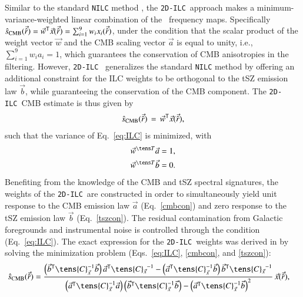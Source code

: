 \documentclass[traditabstract, longauth]{aa}
\newcommand{\twodilc}{{\tt 2D-ILC}}
\newcommand{\1}{\'\i }
\begin{document}
Similar to the standard {\tt NILC} method \citep{2012MNRAS.419.1163B,
2013MNRAS.430..370R}, the \twodilc\ approach makes a minimum-variance-weighted
linear combination of the \Planck\ frequency maps.
Specifically ${\hat{s}_{\rm CMB} (\vec{\hat{r}}) = \vec{w}^{\textsf T}
\vec{x}(\vec{\hat{r}}) = \sum_{i=1}^{9} w_i
x_i(\vec{\hat{r}})}$, under the condition that the scalar product of the
weight vector $\vec{w}$ and the CMB scaling vector $\vec{a}$ is equal to
unity, i.e., ${\sum_{i=1}^{9} w_i a_i = 1}$, which guarantees the
conservation of CMB anisotropies in the filtering. However, \twodilc\
\citep{2011MNRAS.410.2481R} generalizes the standard {\tt NILC} method
by offering an additional constraint for the ILC weights to be orthogonal to
the tSZ emission law $\vec{b}$, while guaranteeing the conservation of the CMB
component. The \twodilc\ CMB estimate is thus given by
\begin{eqnarray}\label{eq:ILC}
  \hat{s}_{\rm CMB} (\vec{\hat{r}})\, =\, \vec{w}^{\textsf T}
  \vec{x}(\vec{\hat{r}}),
\end{eqnarray}
such that the variance of Eq.~\eqref{eq:ILC} is minimized, with
\begin{eqnarray}
  \vec{w}^{\tens T} \vec{a} = 1, & \label{cmbcon} \\
  \vec{w}^{\tens T} \vec{b} = 0. & \label{tszcon}
\end{eqnarray}
Benefiting from the knowledge of the CMB and tSZ spectral signatures, the
weights of the \twodilc\ are constructed in order to simultaneously yield unit
response to the CMB emission law $\vec{a}$ (Eq.~\eqref{cmbcon}) and zero response
to the tSZ emission law $\vec{b}$ (Eq.~\eqref{tszcon}). The residual
contamination from Galactic foregrounds and instrumental noise is controlled
through the condition (Eq.~\eqref{eq:ILC}). The exact expression
for the \twodilc\ weights was derived in \citet{2011MNRAS.410.2481R} by
solving the minimization problem (Eqs.~\eqref{eq:ILC}, \eqref{cmbcon}, and
\eqref{tszcon}):
\begin{align}\label{eq:2D-ILC}
  \hat{s}_{\rm CMB}(\vec{\hat{r}}) &=
  { \left( \vec{b}^{\textsf T} \tens{C}_{\vec{x}}^{-1} \vec{b} \right)
  \vec{a}^{\textsf T} {\tens{C}_{\vec{x}}}^{-1} - \left( \vec{a}^{\textsf T}
  \tens{C}_{\vec{x}}^{-1} \vec{b} \right) \vec{b}^{\textsf T}
  {\tens{C}_{\vec{x}}}^{-1}
  \over
  \left(\vec{a}^{\textsf T} \tens{C}_{\vec{x}}^{-1} \vec{a}
  \right)\left(\vec{b}^{\textsf T} \tens{C}_{\vec{x}}^{-1} \vec{b} \right) -
  \left( \vec{a}^{\textsf T} \tens{C}_{\vec{x}}^{-1} \vec{b} \right)^2 }\,
  \vec{x}(\vec{\hat{r}}),
\end{align}
\end{document}
